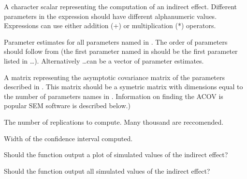 \documentclass[a4paper]{book}
\begin{document}
%
\begin{Arguments}
\begin{ldescription}
\item[\code{expression}] A character scalar representing the computation of an indirect effect. Different parameters in the expression should have different alphanumeric values. Expressions can use either addition (+) or multiplication (*) operators.
\item[\code{...}] Parameter estimates for all parameters named in . The order of parameters should follow from  (the first parameter named in  should be the first parameter listed in \dots). Alternatively \dots can be a vector of parameter estimates.
\item[\code{ACM}] A matrix representing the asymptotic covariance matrix of the parameters described in . This matrix should be a symetric matrix with dimensions equal to the number of parameters names in . Information on finding the ACOV is popular SEM software is described below.)
\item[\code{rep}] The number of replications to compute. Many thousand are reccomended.	
\item[\code{CI}] Width of the confidence interval computed.
\item[\code{plot}] Should the function output a plot of simulated values of the indirect effect?
\item[\code{outputValues}] Should the function output all simulated values of the indirect effect?

\end{ldescription}
\end{Arguments}
%
\end{document}
